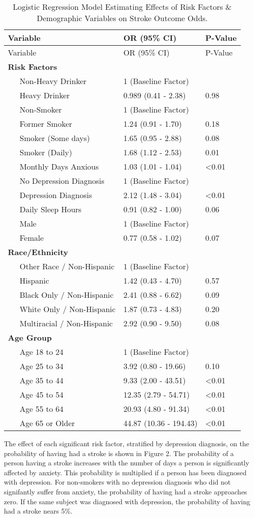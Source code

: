 \documentclass[11pt,]{article}
\begin{document}
\begin{longtable}[]{@{}lll@{}}
\caption{Logistic Regression Model Estimating Effects of Risk Factors \&
Demographic Variables on Stroke Outcome Odds.}\tabularnewline
\toprule
Variable & OR (95\% CI) & P-Value\tabularnewline
\midrule
\endfirsthead
\toprule
Variable & OR (95\% CI) & P-Value\tabularnewline
\midrule
\endhead
\textbf{Risk Factors} & &\tabularnewline
~~~Non-Heavy Drinker & 1 (Baseline Factor) &\tabularnewline
~~~Heavy Drinker & 0.989 (0.41 - 2.38) & 0.98\tabularnewline
~~~Non-Smoker & 1 (Baseline Factor) &\tabularnewline
~~~Former Smoker & 1.24 (0.91 - 1.70) & 0.18\tabularnewline
~~~Smoker (Some days) & 1.65 (0.95 - 2.88) & 0.08\tabularnewline
~~~Smoker (Daily) & 1.68 (1.12 - 2.53) & 0.01\tabularnewline
~~~Monthly Days Anxious & 1.03 (1.01 - 1.04) &
\textless{}0.01\tabularnewline
~~~No Depression Diagnosis & 1 (Baseline Factor) &\tabularnewline
~~~Depression Diagnosis & 2.12 (1.48 - 3.04) &
\textless{}0.01\tabularnewline
~~~Daily Sleep Hours & 0.91 (0.82 - 1.00) & 0.06\tabularnewline
~~~Male & 1 (Baseline Factor) &\tabularnewline
~~~Female & 0.77 (0.58 - 1.02) & 0.07\tabularnewline
\textbf{Race/Ethnicity} & &\tabularnewline
~~~Other Race / Non-Hispanic & 1 (Baseline Factor) &\tabularnewline
~~~Hispanic & 1.42 (0.43 - 4.70) & 0.57\tabularnewline
~~~Black Only / Non-Hispanic & 2.41 (0.88 - 6.62) & 0.09\tabularnewline
~~~White Only / Non-Hispanic & 1.87 (0.73 - 4.83) & 0.20\tabularnewline
~~~Multiracial / Non-Hispanic & 2.92 (0.90 - 9.50) & 0.08\tabularnewline
\textbf{Age Group} & &\tabularnewline
~~~Age 18 to 24 & 1 (Baseline Factor) &\tabularnewline
~~~Age 25 to 34 & 3.92 (0.80 - 19.66) & 0.10\tabularnewline
~~~Age 35 to 44 & 9.33 (2.00 - 43.51) & \textless{}0.01\tabularnewline
~~~Age 45 to 54 & 12.35 (2.79 - 54.71) & \textless{}0.01\tabularnewline
~~~Age 55 to 64 & 20.93 (4.80 - 91.34) & \textless{}0.01\tabularnewline
~~~Age 65 or Older & 44.87 (10.36 - 194.43) &
\textless{}0.01\tabularnewline
\bottomrule
\end{longtable}

The effect of each significant risk factor, stratified by depression
diagnosis, on the probability of having had a stroke is shown in Figure
2. The probability of a person having a stroke increases with the number
of days a person is significantly affected by anxiety. This probability
is multiplied if a person has been diagnosed with depression. For
non-smokers with no depression diagnosis who did not signifantly suffer
from anxiety, the probability of having had a stroke approaches zero. If
the same subject was diagnosed with depression, the probability of
having had a stroke nears 5\%.
\end{document}
